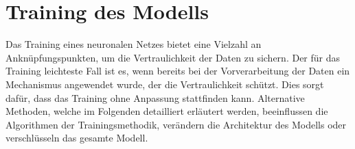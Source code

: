 \section{Training des Modells}\label{sec:training_modells}

Das Training eines neuronalen Netzes bietet eine Vielzahl an Anknüpfungspunkten, um die Vertraulichkeit der Daten zu sichern.
Der für das Training leichteste Fall ist es, wenn bereits bei der Vorverarbeitung der Daten ein Mechanismus angewendet wurde, der die Vertraulichkeit schützt.
Dies sorgt dafür, dass das Training ohne Anpassung stattfinden kann.
Alternative Methoden, welche im Folgenden detailliert erläutert werden, beeinflussen die Algorithmen der Trainingsmethodik, verändern die Architektur des Modells oder verschlüsseln das gesamte Modell.






